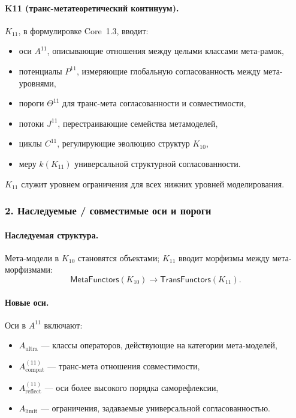 \paragraph{K11 (транс-метатеоретический континуум).}
$K_{11}$, в формулировке Core~1.3, вводит:
\begin{itemize}
  \item оси $A^{11}$, описывающие отношения между целыми классами
        мета-рамок,
  \item потенциалы $P^{11}$, измеряющие глобальную согласованность между
        мета-уровнями,
  \item пороги $\Theta^{11}$ для транс-мета согласованности и совместимости,
  \item потоки $J^{11}$, перестраивающие семейства метамоделей,
  \item циклы $C^{11}$, регулирующие эволюцию структур $K_{10}$,
  \item меру $k(K_{11})$ универсальной структурной согласованности.
\end{itemize}

$K_{11}$ служит уровнем ограничения для всех нижних уровней моделирования.

\subsubsection{2. Наследуемые / совместимые оси и пороги}

\paragraph{Наследуемая структура.}
Мета-модели в $K_{10}$ становятся объектами; $K_{11}$ вводит морфизмы между
мета-морфизмами:
\[
\mathsf{MetaFunctors}(K_{10}) \rightarrow \mathsf{TransFunctors}(K_{11}).
\]

\paragraph{Новые оси.}
Оси в $A^{11}$ включают:
\begin{itemize}
  \item $A_{\mathrm{ultra}}$ — классы операторов, действующие на категории
        мета-моделей,
  \item $A_{\mathrm{compat}}^{(11)}$ — транс-мета отношения совместимости,
  \item $A_{\mathrm{reflect}}^{(11)}$ — оси более высокого порядка саморефлексии,
  \item $A_{\mathrm{limit}}$ — ограничения, задаваемые универсальной согласованностью.
\end{itemize}

